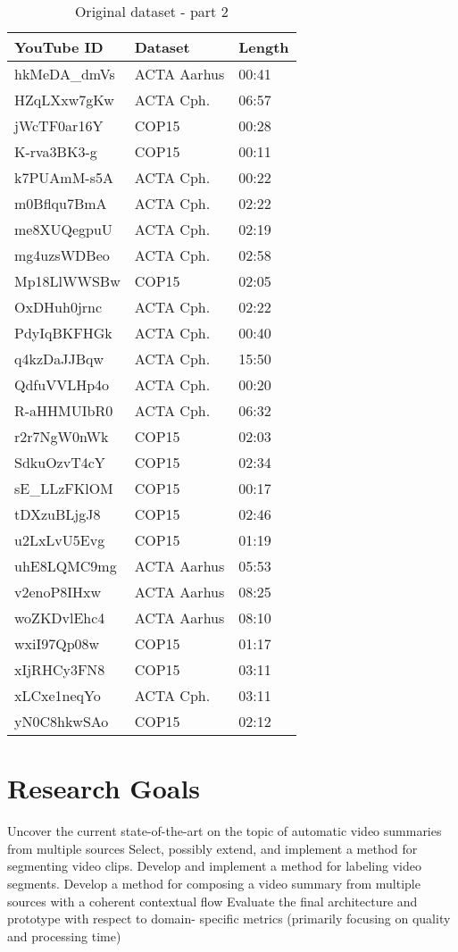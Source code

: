 \begin{table}[!ht]
	\begin{center}
	\caption{Original dataset - part 2}
	\label{tab:orgdataset2}
		\begin{tabular}{lll}
		\toprule
			YouTube ID & Dataset & Length \\
			\midrule
			hkMeDA\_dmVs & ACTA Aarhus & 00:41 \\
			HZqLXxw7gKw & ACTA Cph. & 06:57 \\
			jWcTF0ar16Y & COP15 & 00:28 \\
			K-rva3BK3-g & COP15 & 00:11 \\
			k7PUAmM-s5A & ACTA Cph. & 00:22 \\
			m0Bflqu7BmA & ACTA Cph. & 02:22 \\
			me8XUQegpuU & ACTA Cph. & 02:19 \\
			mg4uzsWDBeo & ACTA Cph. & 02:58 \\
			Mp18LlWWSBw & COP15 & 02:05 \\
			OxDHuh0jrnc & ACTA Cph. & 02:22 \\
			PdyIqBKFHGk & ACTA Cph. & 00:40 \\
			q4kzDaJJBqw & ACTA Cph. & 15:50 \\
			QdfuVVLHp4o & ACTA Cph. & 00:20 \\
			R-aHHMUIbR0 & ACTA Cph. & 06:32 \\
			r2r7NgW0nWk & COP15 & 02:03 \\
			SdkuOzvT4cY & COP15 & 02:34 \\
			sE\_LLzFKlOM & COP15 & 00:17 \\
			tDXzuBLjgJ8 & COP15 & 02:46 \\
			u2LxLvU5Evg & COP15 & 01:19 \\
			uhE8LQMC9mg & ACTA Aarhus & 05:53 \\
			v2enoP8IHxw & ACTA Aarhus & 08:25 \\
			woZKDvlEhc4 & ACTA Aarhus & 08:10 \\
			wxiI97Qp08w & COP15 & 01:17 \\
			xIjRHCy3FN8 & COP15 & 03:11 \\
			xLCxe1neqYo & ACTA Cph. & 03:11 \\
			yN0C8hkwSAo & COP15 & 02:12 \\
		\bottomrule
		\end{tabular}
	\end{center}
\end{table}
%
\section{Research Goals}
%
Uncover the current state-of-the-art on the topic of automatic video summaries from multiple sources
Select, possibly extend, and implement a method for segmenting video clips.
Develop and implement a method for labeling video segments.
Develop a method for composing a video summary from multiple sources with a coherent contextual flow
Evaluate the final architecture and prototype with respect to domain- specific metrics (primarily focusing on quality and processing time)
%